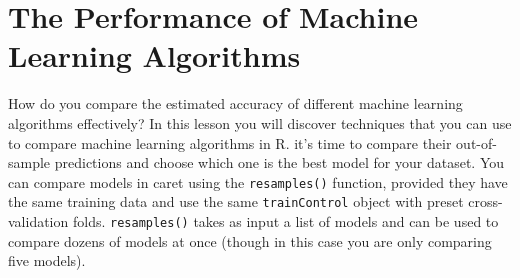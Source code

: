 \documentclass[
]{book}
\begin{document}
\hypertarget{the-performance-of-machine-learning-algorithms-1}{%
\section{The Performance of Machine Learning Algorithms}\label{the-performance-of-machine-learning-algorithms-1}}

How do you compare the estimated accuracy of different machine learning algorithms effectively?
In this lesson you will discover techniques that you can use to compare machine learning algorithms in R.
it's time to compare their out-of-sample predictions and choose which one is the best model for your dataset.
You can compare models in caret using the \texttt{resamples()} function, provided they have the same training data and use the same \texttt{trainControl} object with preset cross-validation folds. \texttt{resamples()} takes as input a list of models and can be used to compare dozens of models at once (though in this case you are only comparing five models).
\end{document}
